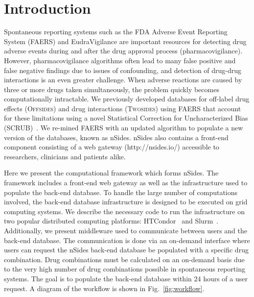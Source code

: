 \documentclass{ws-procs11x85}
\begin{document}
\bodymatter

\section{Introduction}

Spontaneous reporting systems such as the FDA Adverse Event Reporting
System (FAERS) and EudraVigilance are important resources for
detecting drug adverse events during and after the drug approval
process (pharmacovigilance). However, pharmacovigilance algorithms
often lead to many false positive and false negative findings due to
issues of confounding, and detection of drug-drug interactions is an
even greater challenge. When adverse reactions are caused by three or
more drugs taken simultaneously, the problem quickly becomes
computationally intractable. We previously developed databases for
off-label drug effects (O\textsc{ffsides}) and drug interactions
(T\textsc{wosides}) using FAERS that account for these limitations
using a novel Statistical Correction for Uncharacterized Bias
(SCRUB)~\cite{Tatonetti2012}.  We re-mined FAERS with an updated
algorithm to populate a new version of the databases, known as nSides.
nSides also contains a front-end component consisting of a web gateway
(http://nsides.io/) accessible to researchers, clinicians and patients
alike.

Here we present the computational framework which forms
nSides. The framework includes a front-end web gateway as well as the
infrastructure used to populate the back-end database.  To handle the
large number of computations involved, the back-end database
infrastructure is designed to be executed on grid computing
systems. We describe the necessary code to run the infrastructure on
two popular distributed computing platforms: HTCondor~\cite{beowulfbook-condor} and
Slurm~\cite{slurm}. Additionally, we present middleware used to communicate between
users and the back-end database.  The communication is done via an
on-demand interface where users can request the nSides back-end
database be populated with a specific drug combination. Drug
combinations must be calculated on an on-demand basis due to the very
high number of drug combinations possible in spontaneous reporting
systems. The goal is to populate the back-end database within 24 hours
of a user request. A diagram of the workflow is shown in
Fig.~\ref{fig:workflow}.
\end{document}
